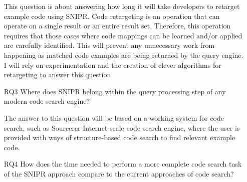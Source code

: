 \begin{itemize}
	This question is about answering how long it will take developers to retarget example code 
	using \uppercase{SnipR}. Code retargeting is an operation that can operate on a 
	single result or an entire result set. Therefore, this operation requires that those cases where 
	code mappings can be learned and/or applied are carefully identified. This will prevent any 
	unnecessary work from happening as matched code examples are being returned by the query engine. 
	I will rely on experimentation and the creation of clever algorithms for retargeting to answer 
	this question.     
	
	
	\item[RQ3] Where does \uppercase{SnipR} belong within the query processing step of any 
	modern code search engine?
	
	The answer to this question will be based on a working system for code search, such as 
	Sourcerer\cite{Bajracharya:2006vn} Internet-scale code search engine, where the user is 
	provided with ways of structure-based code search to find relevant example code.
	
	
	\item[RQ4] How does the time needed to perform a more complete code search task of the 
	\uppercase{SnipR} approach compare to the current approaches of code search? 
	

\end{itemize}
